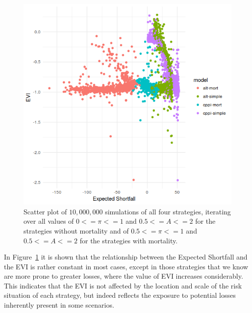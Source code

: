 \begin{figure}[h]
    \centering
    \includegraphics[scale=0.75]{images/evi-es_.png}
    \caption{Scatter plot of $10,000,000$ simulations of all four strategies, iterating over all values of $0 <= \pi <= 1$ and $0.5 <= A <= 2$ for the strategies without mortality and of $0.5 <= \pi <= 1$ and $0.5 <= A <= 2$ for the strategies with mortality.}
    \label{fig:evi-es}
\end{figure}

In Figure~\ref{fig:evi-es} it is shown that the relationship between the Expected Shortfall and the EVI is rather constant in most cases, except in those strategies that we know are more prone to greater losses, where the value of EVI increases considerably. This indicates that the EVI is not affected by the location and scale of the risk situation of each strategy, but indeed reflects the exposure to potential losses inherently present in some scenarios.






